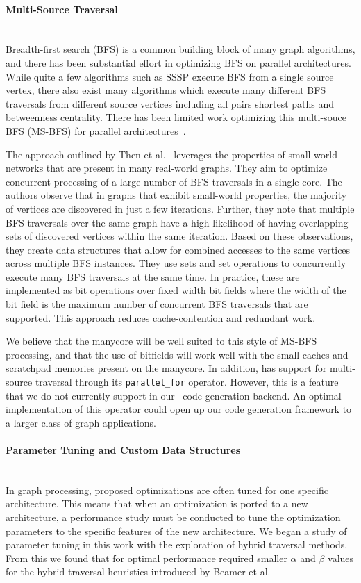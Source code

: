  \paragraph{Multi-Source Traversal}\mbox{}\\
Breadth-first search (BFS) is a common building block of many graph algorithms, and there has been substantial effort in optimizing BFS on parallel architectures. 
While quite a few algorithms such as SSSP execute BFS from a single source vertex, there also exist many algorithms which execute many different BFS traversals from different source vertices including all pairs shortest paths and betweenness centrality.
There has been limited work optimizing this multi-souce BFS (MS-BFS) for parallel architectures~\cite{then2014more, liu2016ibfs}.

The approach outlined by Then et al.~\cite{then2014more} leverages the properties of small-world networks that are present in many real-world graphs.
They aim to optimize concurrent processing of a large number of BFS traversals in a single core.
The authors observe that in graphs that exhibit small-world properties, the majority of vertices are discovered in just a few iterations.
Further, they note that multiple BFS traversals over the same graph have a high likelihood of having overlapping sets of discovered vertices within the same iteration.
Based on these observations, they create data structures that allow for combined accesses to the same vertices across multiple BFS instances.
They use sets and set operations to concurrently execute many BFS traversals at the same time. 
In practice, these are implemented as bit operations over fixed width bit fields where the width of the bit field is the maximum number of concurrent BFS traversals that are supported.
This approach reduces cache-contention and redundant work.

We believe that the manycore will be well suited to this style of MS-BFS processing, and that the use of bitfields will work well with the small caches and scratchpad memories present on the manycore.
In addition, \graphit has support for multi-source traversal through its \lstinline{parallel_for} operator. 
However, this is a feature that we do not currently support in our \hb~code generation backend. 
An optimal implementation of this operator could open up our code generation framework to a larger class of graph applications.

\paragraph{Parameter Tuning and Custom Data Structures}\mbox{}\\
In graph processing, proposed optimizations are often tuned for one specific architecture.
This means that when an optimization is ported to a new architecture, a performance study must be conducted to tune the optimization parameters to the specific features of the new architecture.
We began a study of parameter tuning in this work with the exploration of hybrid traversal methods. 
From this we found that for optimal performance \hb required smaller $\alpha$ and $\beta$ values for the hybrid traversal heuristics introduced by Beamer et al.


